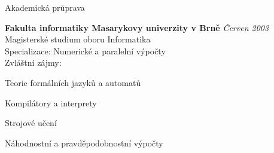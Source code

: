 \documentclass{resume} %
\begin{document}

\begin{rSection}{Akademick\'{a} pr\r{u}prava}

{\bf Fakulta informatiky Masarykovy univerzity v Brn\v{e}} \hfill {\em \v{C}erven 2003} \\ 
Magistersk\'{e} studium oboru Informatika \\
Specializace: Numerick\'{e} a paraleln\'{i} v\'{y}po\v{c}ty \\
Zvl\'{a}\v{s}tn\'{i} z\'{a}jmy:
\item Teorie form\'{a}ln\'{i}ch jazyk\r{u} a automat\r{u}
\item Kompil\'{a}tory a interprety
\item Strojov\'{e} u\v{c}en\'{i}
\item N\'{a}hodnostn\'{i} a pravd\v{e}podobnostn\'{i} v\'{y}po\v{c}ty

\end{rSection}

\end{document}
